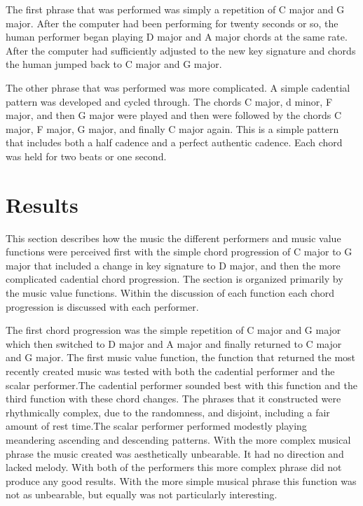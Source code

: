 \documentclass[12pt]{ucthesis}
\begin{document}
{The first phrase that was performed was simply a repetition of C major and G major. After the computer had been performing for twenty seconds or so, the human performer began playing D major and A major chords at the same rate. After the computer had sufficiently adjusted to the new key signature and chords the human jumped back to C major and G major. 

The other phrase that was performed was more complicated. A simple cadential pattern was developed and cycled through. The chords C major, d minor, F major, and then G major were played and then were followed by the chords C major, F major, G major, and finally C major again. This is a simple pattern that includes both a half cadence and a perfect authentic cadence. Each chord was held for two beats or one second.

\chapter{Results}
\label{results}
This section describes how the music the different performers and music value functions were perceived first with the simple chord progression of C major to G major that included a change in key signature to D major, and then the more complicated cadential chord progression. The section is organized primarily by the music value functions. Within the discussion of each function each chord progression is discussed with each performer. 

The first chord progression was the simple repetition of C major and G major which then switched to D major and A major and finally returned to C major and G major. The first music value function, the function that returned the most recently created music was tested with both the cadential performer and the scalar performer.The cadential performer sounded best with this function and the third function with these chord changes. The phrases that it constructed were rhythmically complex, due to the randomness, and disjoint, including a fair amount of rest time.The scalar performer performed modestly playing meandering ascending and descending patterns. With the more complex musical phrase the music created was aesthetically unbearable. It had no direction and lacked melody. With both of the performers this more complex phrase did not produce any good results. With the more simple musical phrase this function was not as unbearable, but equally was not particularly interesting.

}
\end{document}
